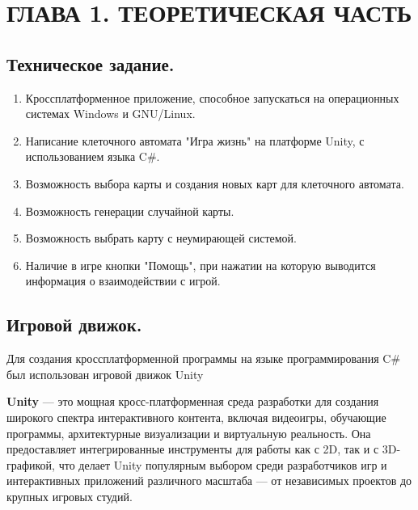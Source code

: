 \chapter{\label{ch:ch01}ГЛАВА 1. ТЕОРЕТИЧЕСКАЯ ЧАСТЬ} %

\section{\label{sec:ch01/sec01}Техническое задание.}
\begin{enumerate}
	\item Кроссплатформенное приложение, способное запускаться на операционных системах Windows и GNU/Linux.
	\item Написание клеточного автомата "Игра жизнь" на платформе Unity, с использованием языка C\#.
	\item Возможность выбора карты и создания новых карт для клеточного автомата.
	\item Возможность генерации случайной карты.
        \item Возможность выбрать карту с неумирающей системой.
	\item Наличие в игре кнопки "Помощь", при нажатии на которую выводится информация о взаимодействии с игрой.
\end{enumerate}

\section{\label{sec:ch01/sec02}Игровой движок.}
Для создания кроссплатформенной программы на языке программирования C\# был использован игровой движок Unity

\textbf{Unity} --- это мощная кросс-платформенная среда разработки для создания широкого спектра интерактивного контента, включая видеоигры, обучающие программы, архитектурные визуализации и виртуальную реальность. Она предоставляет интегрированные инструменты для работы как с 2D, так и с 3D-графикой, что делает Unity популярным выбором среди разработчиков игр и интерактивных приложений различного масштаба — от независимых проектов до крупных игровых студий.

